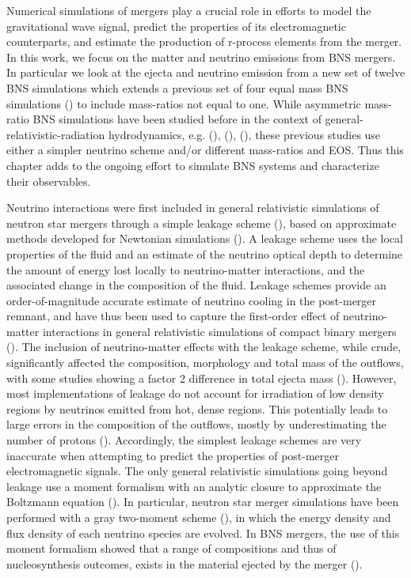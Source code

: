 Numerical simulations of mergers
play a crucial role in efforts to model the gravitational
wave signal, predict the properties of its electromagnetic counterparts,
and estimate the production of r-process elements from the merger. In this work, we
focus on the matter and neutrino emissions from BNS mergers. In particular we look at the ejecta
and neutrino emission from a new set of twelve BNS simulations
which extends a previous set of four equal mass BNS simulations (\citet*{foucart:2015gaa}) to include mass-ratios not equal to one. While asymmetric mass-ratio
BNS simulations have been studied before in the context of general-relativistic-radiation
hydrodynamics, e.g. (\citet*{sekiguchi2016dynamical}), (\citet*{lehner2016unequal}), (\citet*{radice2016dynamical}),
these previous studies use either a simpler neutrino scheme and/or
different mass-ratios and EOS. Thus this chapter adds to the ongoing effort to simulate
BNS systems and characterize their observables.

Neutrino interactions were first included in general relativistic simulations of neutron star mergers through a simple leakage scheme (\citet*{sekiguchi:2011zd}), based on approximate methods developed for Newtonian simulations (\citet*{ruffert1996,rosswog:2003rv}). A leakage scheme uses the local properties of the fluid and an estimate of the neutrino optical depth to determine the amount of energy lost locally to neutrino-matter interactions, and the associated change in the composition of the fluid. Leakage schemes provide an order-of-magnitude accurate estimate of neutrino cooling in the post-merger remnant, and have thus been used to capture the first-order effect of neutrino-matter interactions in general relativistic simulations of compact binary mergers (\citet*{sekiguchi:2011zd,wanajo2014,lehner2016unequal,radice2016dynamical,palenzuela2015,deaton2013black,foucart2014neutron}). The inclusion of neutrino-matter effects with the leakage scheme, while crude, significantly affected the composition, morphology and total mass of the outflows, with some studies showing a factor 2 difference in total ejecta mass (\citet*{radice2016dynamical}). However, most implementations of leakage do not account for irradiation of low density regions by neutrinos emitted from hot, dense regions. This potentially leads to large errors in the composition of the outflows, mostly by underestimating the number of protons (\citet*{foucartm1:2016,foucart2015post}). Accordingly, the simplest leakage schemes are very inaccurate when attempting to predict the properties of post-merger electromagnetic signals. The only general relativistic simulations going beyond leakage use a moment formalism with an analytic closure to approximate the Boltzmann equation (\citet*{1981mnras.194..439t,shibata:11}). In particular, neutron star merger simulations have been performed with a gray two-moment scheme (\citet*{foucartm1:2016,foucart2015post,sekiguchi2015dynamical,sekiguchi2016dynamical}), in which the energy density and flux density of each neutrino species are evolved. In BNS mergers, the use of this moment formalism showed that a range of compositions and thus of nucleosynthesis outcomes, exists in the material ejected by the merger (\citet*{wanajo2014}). 

